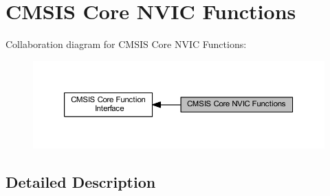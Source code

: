 \hypertarget{group___c_m_s_i_s___core___n_v_i_c_functions}{}\section{C\+M\+S\+IS Core N\+V\+IC Functions}
\label{group___c_m_s_i_s___core___n_v_i_c_functions}
Collaboration diagram for C\+M\+S\+IS Core N\+V\+IC Functions\+:
\nopagebreak
\begin{figure}[H]
\begin{center}
\leavevmode
\includegraphics[width=350pt]{group___c_m_s_i_s___core___n_v_i_c_functions}
\end{center}
\end{figure}


\subsection{Detailed Description}
